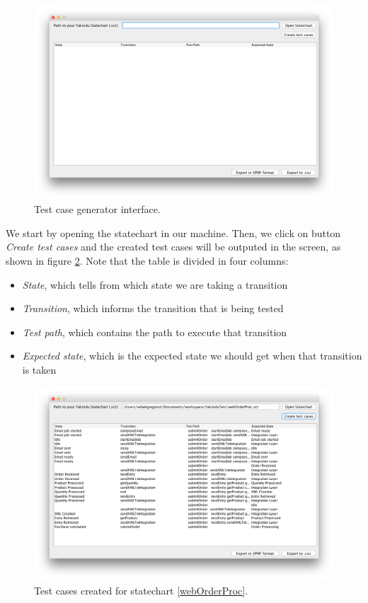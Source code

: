 \begin{figure}[htb]
\centering
\includegraphics[width=\textwidth]{figuras/testGenClean}
\caption{\label{testGenClean} Test case generator interface.}
\end{figure}

We start by opening the statechart in our machine. Then, we click on button \textit{Create test cases} and the created test cases will be outputed in the screen, as shown in figure \ref{testGenResults}. Note that the table is divided in four columns: 
\begin{itemize}
\item \textit{State}, which tells from which state we are taking a transition
\item \textit{Transition}, which informs the transition that is being tested 
\item \textit{Test path}, which contains the path to execute that transition
\item \textit{Expected state}, which is the expected state we should get when that transition is taken
\end{itemize}

\begin{figure}[htb]
\centering
\includegraphics[width=\textwidth]{figuras/testGenResults}
\caption{\label{testGenResults} Test cases created for statechart \ref{webOrderProc}.}
\end{figure}

